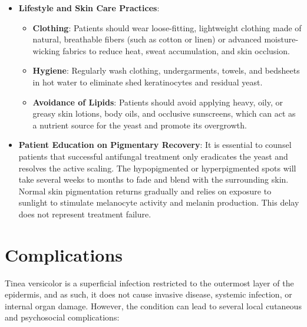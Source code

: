 \begin{itemize}
\begin{itemize}
        \item \textbf{Fluconazole}: Administered as a single oral dose of 300--400 mg, which may be repeated 1--2 weeks later. Alternatively, it can be prescribed at 150 mg weekly for 2--4 weeks.
        \item \textbf{Important Therapeutic Exclusions}: Oral terbinafine and oral griseofulvin are \textit{not} effective for the treatment of tinea versicolor. Oral terbinafine is not delivered to the skin surface via sweat or sebum in concentrations sufficient to kill \textit{Malassezia}, and griseofulvin has no activity against this genus of yeast.
    \end{itemize}
    \item \textbf{Lifestyle and Skin Care Practices}:
    \begin{itemize}
        \item \textbf{Clothing}: Patients should wear loose-fitting, lightweight clothing made of natural, breathable fibers (such as cotton or linen) or advanced moisture-wicking fabrics to reduce heat, sweat accumulation, and skin occlusion.
        \item \textbf{Hygiene}: Regularly wash clothing, undergarments, towels, and bedsheets in hot water to eliminate shed keratinocytes and residual yeast.
        \item \textbf{Avoidance of Lipids}: Patients should avoid applying heavy, oily, or greasy skin lotions, body oils, and occlusive sunscreens, which can act as a nutrient source for the yeast and promote its overgrowth.
    \end{itemize}
    \item \textbf{Patient Education on Pigmentary Recovery}: It is essential to counsel patients that successful antifungal treatment only eradicates the yeast and resolves the active scaling. The hypopigmented or hyperpigmented spots will take several weeks to months to fade and blend with the surrounding skin. Normal skin pigmentation returns gradually and relies on exposure to sunlight to stimulate melanocyte activity and melanin production. This delay does not represent treatment failure.
\end{itemize}

\section*{Complications}
Tinea versicolor is a superficial infection restricted to the outermost layer of the epidermis, and as such, it does not cause invasive disease, systemic infection, or internal organ damage. However, the condition can lead to several local cutaneous and psychosocial complications:

